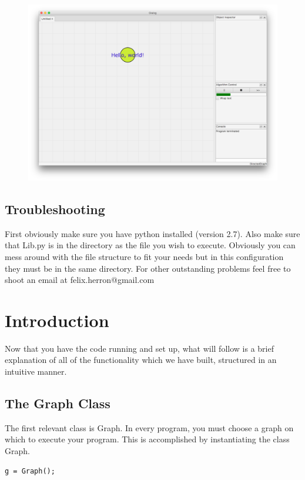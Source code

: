 \documentclass{article}
\begin{document}
\begin{figure}[H]
\centering
\includegraphics[width=\textwidth]{helloWorld.png}
\end{figure}

\subsection{Troubleshooting}
First obviously make sure you have python installed (version 2.7). Also make sure that Lib.py is in the directory as the file you wish to execute. Obviously you can mess around with the file structure to fit your needs but in this configuration they must be in the same directory. For other outstanding problems feel free to shoot an email at felix.herron@gmail.com 

\section{Introduction}
Now that you have the code running and set up, what will follow is a brief explanation of all of the functionality which we have built, structured in an intuitive manner.

\subsection{The Graph Class}
The first relevant class is Graph. In every program, you must choose a graph on which to execute your program. This is accomplished by instantiating the class Graph. 

\begin{lstlisting}
g = Graph();
\end{lstlisting}
\end{document}
